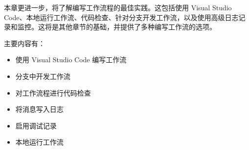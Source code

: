 本章更进一步，将了解编写工作流程的最佳实践。这包括使用 Visual Studio Code、本地运行工作流、代码检查、针对分支开发工作流，以及使用高级日志记录和监控。这将是其他章节的基础，并提供了多种编写工作流的选项。

主要内容有：

\begin{itemize}
\item 
使用 Visual Studio Code 编写工作流

\item 
分支中开发工作流

\item 
对工作流程进行代码检查

\item 
将消息写入日志

\item 
启用调试记录

\item 
本地运行工作流
\end{itemize}